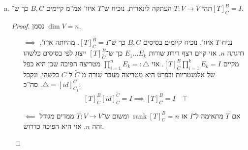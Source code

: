 \documentclass[]{article}
\newcommand\vphi  {\varphi}
\DeclareMathOperator\Img   {Im}
\newcommand\trio  {\triangle}
\DeclareMathOperator{\row}    {Row}
\DeclareMathOperator{\rk}     {rank}
\newcommand\co        {\colon}
\newcommand\tl    {\tilde}
\newcommand\op    {^{-1}}
\theoremstyle{definition}
\begin{document}
\begin{enumerate}[(a)]
\begin{proof}
            נחזור לטענה עצמה. 
            \begin{itemize}
                \item[$\implies$] אם $\exists B_1, B_2 \subseteq V, C_1, C_2 \subseteq U \co [S]^{B_2}_{C_2} = [T]^{B_1}_{C_1}$ אזי: 
                \[ \dim \Img S = \dim \row [\vphi]^{C_2}_{B_2} = \dim \row [\vphi]_{B_1}^{C_1} = \dim \Img T \]
                כדרוש. 
                \item[$\impliedby$] אם $\dim \Img S = \dim \Img T$, אז קיימים בסיסים כלשהם כך ש־$[T]^{\tl B_1}_{\tl C_1}, [S]_{C_2}^{B_2}$ המטריצות המייצגות. בשיעורי בית קודמים ראינו שהמטריצות להלן מתאימות אמ''מ $\rk [T]^{\tl B_1}_{\tl C_1} = \rk [S]_{B_2}^{C_2}$ מה שאכן מתקיים שכן: 
                \[ \rk [T]^{\tl B_1}_{\tl C_1} = \dim \row [T]^{\tl B_1}_{\tl C_1} = \dim \Img T = \dim \Img T = \dim \row [S]_{C_2}^{B_2} = \rk [S]_{C_2}^{B_2} \]
                ומשום שהן מתאימות קיימים קיימות $P, Q$ הפיכות כך ש־$Q\op [T]^{\tl B_1}_{\tl C_1} P$ ומשום שהן הפיכות הן בפרט מטריצות העברת בסיס כלשהן מ־$\tl B_1$ ל־$B_1$ כלשהו וכן מ־$\tl C_1$ ל־$C_1$ כלשהו, ועל כן קיימים $B_1, C_1$ כך ש־$[T]^{\tl B_1}_{\tl C_1} = Q\op [T]^{B_1}_{C_1}P$. סה''כ הראינו קיום $C_1, B_1, C_2, B_2$ כך ש־$[T]^{B_1}_{C_1} = [S]_{B_2}^{C_2}$ כדרוש. 
            \end{itemize}
        \end{proof}
        \item תהי $T \co V \to V$ העתקה לינארית, נוכיח ש־$T$ איזו' אמ''מ קיימים $B, C$ כך ש־$[T]^{B}_C = I$. \begin{proof}נסמן $\dim V = n$. 
            \begin{itemize}
                \item[$\implies$]נניח $T$ איזו', נוכיח קיומים בסיסים $B, C$ כך ש־$[T]^{B}_C = I$. מהיותה איזו', דרגתה $n$. אזי קיים רצף דירוג שורות $E_1 \dots E_k$ כך ש־$[T]^{B}_{\tl C}$ ייצוג לפי בסיסים כלשהו מקיים $[T]^{B}_{\tl C}\prod_{i = 1}^{k}E_k = I$. אזי $\prod_{i = 1}^{n}E_k =: \trio$ מטריצה הפיכה שכן היא כפל של אלמנטריות ובפרט היא מטריצה מעבר שורה מ־$\tl C$ ל־$C$ כלשהי, ונקבל $\trio = [id]^{C}_{C_1}$. סה''כ: 
                \[ [T]^{B}_{\tl C}[id]^{\tl C}_{C} = I \implies [T]^{B}_{C} = I \quad \top \]
                \item[$\impliedby$] אם $T$ מתאימה ל־$I$ אז $\rk [T]^{B}_C = n$ ומשום ש־$T \co V \to V$ ממדים מגודל זהה $n$, אזי היא הפיכה כדרוש. 
            \end{itemize}
        \end{proof}
    \end{enumerate}
    
\end{document}
